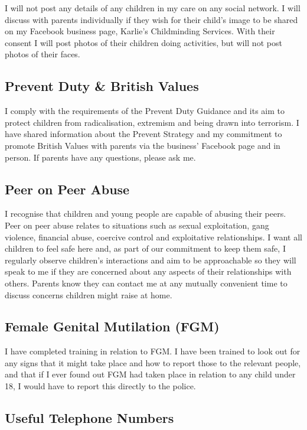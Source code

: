 I will not post any details of any children in my care on any
social network. I will discuss with parents individually if they wish 
for their child's image to be shared on my Facebook business page, Karlie's 
Childminding Services. With their consent I will post photos of their children
doing activities, but will not post photos of their faces. 

\subsection{Prevent Duty \& British Values}

I comply with the requirements of the Prevent Duty Guidance and its aim to
protect children from radicalisation, extremism and being drawn into terrorism.
I have shared information about the Prevent Strategy and my commitment to 
promote British Values with parents via the business' Facebook page and in person. 
If parents have any questions, please ask me.

\subsection{Peer on Peer Abuse}

I recognise that children and young people are capable of abusing their peers. Peer on peer abuse
relates to situations such as sexual exploitation, gang violence, financial abuse, coercive control and
exploitative relationships. I want all children to feel safe here and, as part of our commitment to keep
them safe, I regularly observe children’s interactions and aim to be approachable so they will speak to me
if they are concerned about any aspects of their relationships with others. Parents know they can contact
me at any mutually convenient time to discuss concerns children might raise at home. 

\subsection{Female Genital Mutilation (FGM)}

I have completed training in relation to FGM. I have been trained to look out for any signs that it might 
take place and how to report those to the relevant people, and that if I ever found out FGM had taken 
place in relation to any child under 18, I would have to report this directly to the police. 


\subsection{Useful Telephone Numbers}

